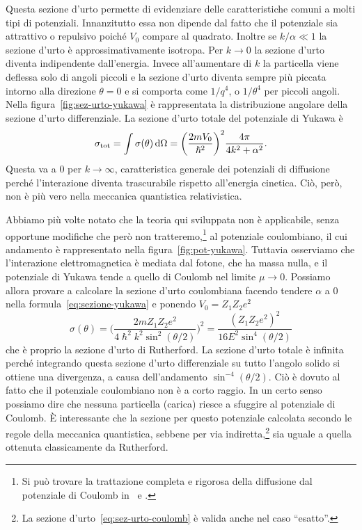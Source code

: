 \documentclass[a4paper,fleqn,twoside,12pt]{article}
\newcommand*{\dd}{\mathop{}\!\mathrm{d}} %
\begin{document}
Questa sezione d'urto permette di evidenziare delle caratteristiche comuni a
molti tipi di potenziali.  Innanzitutto essa non dipende dal fatto che il
potenziale sia attrattivo o repulsivo poiché $V_{0}$ compare al quadrato.
Inoltre se $k/\alpha \ll 1$ la sezione d'urto è approssimativamente isotropa.
Per $k \to 0$ la sezione d'urto diventa indipendente dall'energia.  Invece
all'aumentare di $k$ la particella viene deflessa solo di angoli piccoli e la
sezione d'urto diventa sempre più piccata intorno alla direzione $\theta = 0$ e
si comporta come $1/q^{4}$, o $1/\theta^{4}$ per piccoli angoli.  Nella
figura~\ref{fig:sez-urto-yukawa} è rappresentata la distribuzione angolare della
sezione d'urto differenziale.  La sezione d'urto totale del potenziale di Yukawa
è
\begin{equation}
  \sigma_{\textup{tot}} = \int \sigma(\theta) \dd\Omega =
  \bigg(\frac{2mV_{0}}{\hslash^{2}}\bigg)^{2} \frac{4\pi}{4k^{2} + \alpha^{2}}.
\end{equation}
Questa va a $0$ per $k \to \infty$, caratteristica generale dei potenziali di
diffusione perché l'interazione diventa trascurabile rispetto all'energia
cinetica.  Ciò, però, non è più vero nella meccanica quantistica relativistica.

Abbiamo più volte notato che la teoria qui sviluppata non è applicabile, senza
opportune modifiche che però non
tratteremo,\footnote{Si può trovare la trattazione completa e rigorosa della
  diffusione dal potenziale di Coulomb
  in~\textcite[368-373]{gottfried:quantum-mechanics} e
  \textcites[655-659]{landau:meccanica-quantistica}.}
al potenziale coulombiano, il cui andamento è rappresentato nella
figura~\ref{fig:pot-yukawa}.  Tuttavia osserviamo che l'interazione
elettromagnetica è mediata dal fotone, che ha massa nulla, e il potenziale di
Yukawa tende a quello di Coulomb nel limite $\mu \to 0$.  Possiamo allora
provare a calcolare la sezione d'urto coulombiana facendo tendere $\alpha$ a $0$
nella formula~\eqref{eq:sezione-yukawa} e ponendo $V_{0} = Z_{1}Z_{2}e^{2}$
\begin{equation}
  \label{eq:sez-urto-coulomb}
  \sigma(\theta) =
  \bigg(\frac{2mZ_{1}Z_{2}e^{2}}{4\hslash^{2}k^{2}\sin^{2}(\theta/2)}\bigg)^{2}=
  \frac{(Z_{1}Z_{2}e^{2})^{2}}{16E^{2}\sin^{4}(\theta/2)}
\end{equation}
che è proprio la sezione d'urto di Rutherford.  La sezione d'urto totale è
infinita perché integrando questa sezione d'urto differenziale su tutto l'angolo
solido si ottiene una divergenza, a causa dell'andamento $\sin^{-4}(\theta/2)$.
Ciò è dovuto al fatto che il potenziale coulombiano non è a corto raggio.  In un
certo senso possiamo dire che nessuna particella (carica) riesce a sfuggire al
potenziale di Coulomb.  È interessante che la sezione per questo potenziale
calcolata secondo le regole della meccanica quantistica, sebbene per via
indiretta,\footnote{La sezione d'urto~\eqref{eq:sez-urto-coulomb} è valida anche
  nel caso ``esatto''.}
sia uguale a quella ottenuta classicamente da Rutherford.
\end{document}
